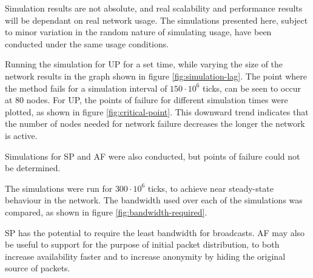 			Simulation results are not absolute, and real scalability and performance results will be dependant on real network usage. The simulations presented here, subject to minor variation in the random nature of simulating usage, have been conducted under the same usage conditions.
			
			Running the simulation for UP for a set time, while varying the size of the network results in the graph shown in figure \ref{fig:simulation-lag}. The point where the method fails for a simulation interval of $150\cdot10^6$ ticks, can be seen to occur at 80 nodes. For UP, the points of failure for different simulation times were plotted, as shown in figure \ref{fig:critical-point}. This downward trend indicates that the number of nodes needed for network failure decreases the longer the network is active.
			
			Simulations for SP and AF were also conducted, but points of failure could not be determined.
			
			The simulations were run for $300\cdot10^6$ ticks, to achieve near steady-state behaviour in the network. The bandwidth used over each of the simulations was compared, as shown in figure \ref{fig:bandwidth-required}.
			
			SP has the potential to require the least bandwidth for broadcasts. AF may also be useful to support for the purpose of initial packet distribution, to both increase availability faster and to increase anonymity by hiding the original source of packets.
			